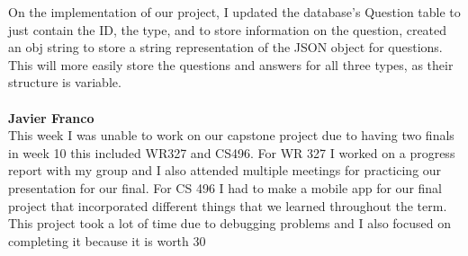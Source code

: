 \documentclass[../final.tex]{subfiles}
\begin{document}
On the implementation of our project, I updated the database's Question table to just contain the ID, the type, and to store information on the question, created an obj string to store a string representation of the JSON object for questions. This will more easily store the questions and answers for all three types, as their structure is variable. \\ \\
\textbf{Javier Franco}\\
This week I was unable to work on our capstone project due to having two finals in week 10 this included WR327 and CS496. For WR 327 I worked on a progress report with my group and I also attended multiple meetings for practicing our presentation for our final. For CS 496 I had to make a mobile app for our final project that incorporated different things that we learned throughout the term. This project took a lot of time due to debugging problems and I also focused on completing it because it is worth 30%
\end{document}
